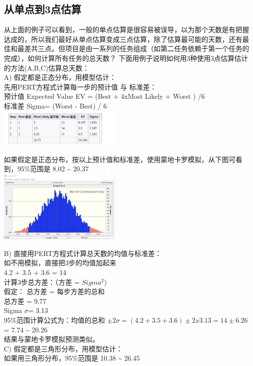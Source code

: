 \hypertarget{ux4eceux5355ux70b9ux52303ux70b9ux4f30ux7b97}{%
\subsection{从单点到3点估算}\label{ux4eceux5355ux70b9ux52303ux70b9ux4f30ux7b97}}

从上面的例子可以看到，一般的单点估算是很容易被误导，以为那个天数是有把握达成的，所以我们最好从单点估算变成三点估算，除了估算最可能的天数，还有最佳和最差共三点。但项目是由一系列的任务组成（如第二任务依赖于第一个任务的完成），如何计算所有任务的总天数？
下面用例子说明如何用3种使用3点估算估计的方法(A,B,C)估算总天数：\\
A) 假定都是正态分布，用模型估计：\\
先用PERT方程式计算每一步的预计值 与 标准差：\\
预计值 Expected Value EV = (Best + 4xMost Likely + Worst ) /6\\
标准差 Sigma= (Worst - Best) / 6\\

\includegraphics[width=6cm]{Screenshotfrom20221215004629.png}

如果假定是正态分布，按以上预计值和标准差，使用蒙地卡罗模拟，从下图可看到，95\%范围是
8.02 \textasciitilde{} 20.37\\

\includegraphics[width=6cm]{pert31.png}

B) 直接用PERT方程式计算总天数的均值与标准差：\\
如不用模拟，直接把3步的均值加起来\\
4.2 + 3.5 + 3.6 = 14\\
计算3步总方差：（方差 = \(Sigma^2\))\\
假定： 总方差 = 每步方差的总和\\
总方差 = 9.77\\
Sigma \(\sigma\)= 3.13\\
95\%范围计算公式为：均值的总和
\(\pm 2 \sigma = (4.2 + 3.5 + 3.6) \pm 2 x 3.13  = 14 \pm 6.26\)= 7.74
\textasciitilde{} 20.26\\
结果与蒙地卡罗模拟预测类似。\\
C) 假定都是三角形分布，用模型估计：\\
如果用三角形分布，95\%范围是 10.38 \textasciitilde{} 26.45\\

